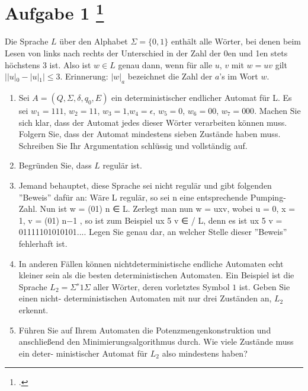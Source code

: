 \documentclass{lehramt-informatik-aufgabe}
\begin{document}
\liAufgabenTitel{}
\section{Aufgabe 1
\index{}
\footcite{66115:2015:03}}

Die Sprache $L$ über den Alphabet $\Sigma = \{0, 1\}$ enthält alle
Wörter, bei denen beim Lesen von links nach rechts der Unterschied in
der Zahl der 0en und 1en stets höchstens 3 ist. Also ist $w \in L$ genau
dann, wenn für alle $u$, $v$ mit $w = uv$ gilt $||u|_0 − |u|_1| \leq 3$.
Erinnerung: $|w|_a$ bezeichnet die Zahl der $a$’s im Wort $w$.

\begin{enumerate}


\item Sei $A = (Q, \Sigma, \delta, q_0 , E)$ ein deterministischer
endlicher Automat für L. Es sei $w_1 = 111$, $w_2 = 11$, $w_3 = 1$,$ w_4
= \epsilon$, $w_5 = 0$, $w_6 = 00$, $w_7 = 000$. Machen Sie sich klar,
dass der Automat jedes dieser Wörter verarbeiten können muss. Folgern
Sie, dass der Automat mindestens sieben Zustände haben muss. Schreiben
Sie Ihr Argumentation schlüssig und vollständig auf.


\item Begründen Sie, dass $L$ regulär ist.


\item Jemand behauptet, diese Sprache sei nicht regulär und gibt folgenden ”Beweis”
dafür an: Wäre L regulär, so sei n eine entsprechende Pumping-Zahl. Nun ist w =
(01) n ∈ L. Zerlegt man nun w = uxv, wobei u = 0, x = 1, v = (01) n−1 , so ist zum
Beispiel ux 5 v ∈
/ L, denn es ist ux 5 v = 01111101010101....
Legen Sie genau dar, an welcher Stelle dieser ”Beweis” fehlerhaft ist.


\item In anderen Fällen können nichtdeterministische endliche Automaten
echt kleiner sein als die besten deterministischen Automaten. Ein
Beispiel ist die Sprache $L_2 = \Sigma^∗ 1 \Sigma$ aller Wörter, deren
vorletztes Symbol $1$ ist. Geben Sie einen nicht- deterministischen
Automaten mit nur drei Zuständen an, $L_2$ erkennt.


\item Führen Sie auf Ihrem Automaten die Potenzmengenkonstruktion und
anschließend den Minimierungsalgorithmus durch. Wie viele Zustände
muss ein deter- ministischer Automat für $L_2$ also mindestens haben?
\end{enumerate}
\end{document}
